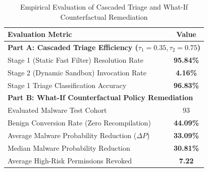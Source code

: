 \begin{table}[t]
\centering
\caption{Empirical Evaluation of Cascaded Triage and What-If Counterfactual Remediation}
\label{tab:triage_and_remediation}
\begin{tabular}{lc}
\hline
\textbf{Evaluation Metric} & \textbf{Value} \\
\hline
\multicolumn{2}{l}{\textbf{Part A: Cascaded Triage Efficiency ($\tau_1=0.35, \tau_2=0.75$)}} \\
Stage 1 (Static Fast Filter) Resolution Rate & \textbf{95.84\%} \\
Stage 2 (Dynamic Sandbox) Invocation Rate & \textbf{4.16\%} \\
Stage 1 Triage Classification Accuracy & \textbf{96.83\%} \\
\hline
\multicolumn{2}{l}{\textbf{Part B: What-If Counterfactual Policy Remediation}} \\
Evaluated Malware Test Cohort & 93 \\
Benign Conversion Rate (Zero Recompilation) & \textbf{44.09\%} \\
Average Malware Probability Reduction ($\Delta P$) & \textbf{33.09\%} \\
Median Malware Probability Reduction & \textbf{30.81\%} \\
Average High-Risk Permissions Revoked & \textbf{7.22} \\
\hline
\end{tabular}
\end{table}
